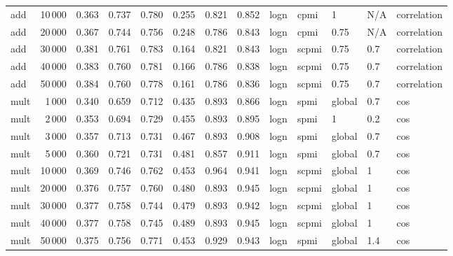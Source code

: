 \begin{tabular}{lrrrrrrrlllll}
     add &           10\,000 &      0.363 &  0.737 &  0.780 &  0.255 &      0.821 &      0.852 &  logn &   cpmi &       1 &  N/A &    correlation \\
     add &           20\,000 &      0.367 &  0.744 &  0.756 &  0.248 &      0.786 &      0.843 &  logn &   cpmi &    0.75 &  N/A &    correlation \\
     add &           30\,000 &      0.381 &  0.761 &  0.783 &  0.164 &      0.821 &      0.843 &  logn &  scpmi &    0.75 &  0.7 &    correlation \\
     add &           40\,000 &      0.383 &  0.760 &  0.781 &  0.166 &      0.786 &      0.838 &  logn &  scpmi &    0.75 &  0.7 &    correlation \\
     add &           50\,000 &      0.384 &  0.760 &  0.778 &  0.161 &      0.786 &      0.836 &  logn &  scpmi &    0.75 &  0.7 &    correlation \\
    mult &            1\,000 &      0.340 &  0.659 &  0.712 &  0.435 &      0.893 &      0.866 &  logn &   spmi &  global &  0.7 &            cos \\
    mult &            2\,000 &      0.353 &  0.694 &  0.729 &  0.455 &      0.893 &      0.895 &  logn &   spmi &       1 &  0.2 &            cos \\
    mult &            3\,000 &      0.357 &  0.713 &  0.731 &  0.467 &      0.893 &      0.908 &  logn &   spmi &  global &  0.7 &            cos \\
    mult &            5\,000 &      0.360 &  0.721 &  0.731 &  0.481 &      0.857 &      0.911 &  logn &   spmi &  global &  0.7 &            cos \\
    mult &           10\,000 &      0.369 &  0.746 &  0.762 &  0.453 &      0.964 &      0.941 &  logn &  scpmi &  global &    1 &            cos \\
    mult &           20\,000 &      0.376 &  0.757 &  0.760 &  0.480 &      0.893 &      0.945 &  logn &  scpmi &  global &    1 &            cos \\
    mult &           30\,000 &      0.377 &  0.758 &  0.744 &  0.479 &      0.893 &      0.942 &  logn &  scpmi &  global &    1 &            cos \\
    mult &           40\,000 &      0.377 &  0.758 &  0.745 &  0.489 &      0.893 &      0.945 &  logn &  scpmi &  global &    1 &            cos \\
    mult &           50\,000 &      0.375 &  0.756 &  0.771 &  0.453 &      0.929 &      0.943 &  logn &   spmi &  global &  1.4 &            cos \\

\end{tabular}
